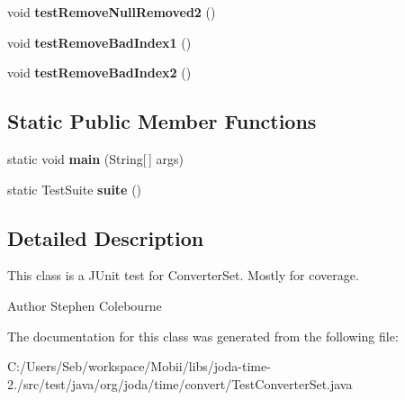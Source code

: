 \begin{DoxyCompactItemize}
\item 
\hypertarget{classorg_1_1joda_1_1time_1_1convert_1_1_test_converter_set_afb4af6b497e32ff5f6b43aee608b92c6}{void {\bfseries test\-Remove\-Null\-Removed2} ()}\label{classorg_1_1joda_1_1time_1_1convert_1_1_test_converter_set_afb4af6b497e32ff5f6b43aee608b92c6}

\item 
\hypertarget{classorg_1_1joda_1_1time_1_1convert_1_1_test_converter_set_a30ff92eff11d403824d5311c1e34321f}{void {\bfseries test\-Remove\-Bad\-Index1} ()}\label{classorg_1_1joda_1_1time_1_1convert_1_1_test_converter_set_a30ff92eff11d403824d5311c1e34321f}

\item 
\hypertarget{classorg_1_1joda_1_1time_1_1convert_1_1_test_converter_set_a4bbce36a7b1ead4e883050375993b853}{void {\bfseries test\-Remove\-Bad\-Index2} ()}\label{classorg_1_1joda_1_1time_1_1convert_1_1_test_converter_set_a4bbce36a7b1ead4e883050375993b853}

\end{DoxyCompactItemize}
\subsection*{Static Public Member Functions}
\begin{DoxyCompactItemize}
\item 
\hypertarget{classorg_1_1joda_1_1time_1_1convert_1_1_test_converter_set_a42955142e73e7b228cf6079f6587cfca}{static void {\bfseries main} (String\mbox{[}$\,$\mbox{]} args)}\label{classorg_1_1joda_1_1time_1_1convert_1_1_test_converter_set_a42955142e73e7b228cf6079f6587cfca}

\item 
\hypertarget{classorg_1_1joda_1_1time_1_1convert_1_1_test_converter_set_ae2b6c9f5f51ee08e0839c1201b8a10af}{static Test\-Suite {\bfseries suite} ()}\label{classorg_1_1joda_1_1time_1_1convert_1_1_test_converter_set_ae2b6c9f5f51ee08e0839c1201b8a10af}

\end{DoxyCompactItemize}


\subsection{Detailed Description}
This class is a J\-Unit test for Converter\-Set. Mostly for coverage.

\begin{DoxyAuthor}{Author}
Stephen Colebourne 
\end{DoxyAuthor}


The documentation for this class was generated from the following file\-:\begin{DoxyCompactItemize}
\item 
C\-:/\-Users/\-Seb/workspace/\-Mobii/libs/joda-\/time-\/2./src/test/java/org/joda/time/convert/Test\-Converter\-Set.\-java\end{DoxyCompactItemize}
